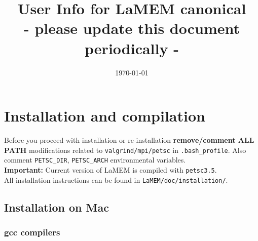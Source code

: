 \documentclass[a4paper,11pt]{article}
\title{User Info for LaMEM canonical\\ \large - please update this document periodically -}
\date{\today}
\begin{document}
\maketitle
\tableofcontents

\newpage

\pagestyle{fancyplain}
\rhead[\fancyplain{}{\slshape \rightmark}]{\thepage}
\lhead[\thepage]{\fancyplain{}%
{\slshape \leftmark}}
\cfoot{}


\section{Installation and compilation}
Before you proceed with installation or re-installation \textbf{remove/comment ALL PATH} modifications related to \texttt{valgrind/mpi/petsc} in \texttt{.bash\_profile}.
Also comment \texttt{PETSC\_DIR}, \texttt{PETSC\_ARCH} environmental variables.\\

\textbf{Important:} Current version of LaMEM is compiled with \texttt{petsc3.5}.\\

All installation instructions can be found in \texttt{LaMEM/doc/installation/}. \\

\subsection{Installation on Mac}

\subsubsection{gcc compilers}
\end{document}
